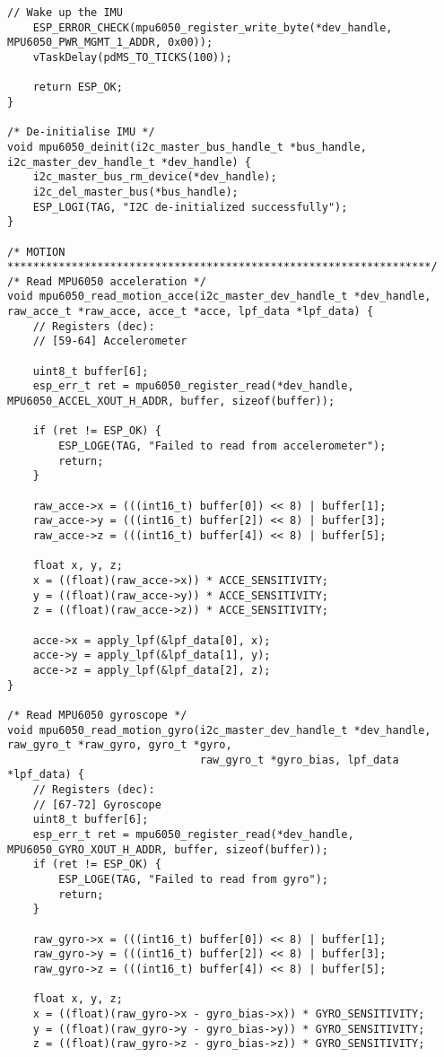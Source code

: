 \begin{lstlisting}[caption={Register Read}]
    // Wake up the IMU
    ESP_ERROR_CHECK(mpu6050_register_write_byte(*dev_handle, MPU6050_PWR_MGMT_1_ADDR, 0x00));
    vTaskDelay(pdMS_TO_TICKS(100)); 

    return ESP_OK;
}

/* De-initialise IMU */
void mpu6050_deinit(i2c_master_bus_handle_t *bus_handle, i2c_master_dev_handle_t *dev_handle) {
    i2c_master_bus_rm_device(*dev_handle);
    i2c_del_master_bus(*bus_handle);
    ESP_LOGI(TAG, "I2C de-initialized successfully");
}

/* MOTION ******************************************************************/
/* Read MPU6050 acceleration */
void mpu6050_read_motion_acce(i2c_master_dev_handle_t *dev_handle, raw_acce_t *raw_acce, acce_t *acce, lpf_data *lpf_data) {
    // Registers (dec):
    // [59-64] Accelerometer

    uint8_t buffer[6];
    esp_err_t ret = mpu6050_register_read(*dev_handle, MPU6050_ACCEL_XOUT_H_ADDR, buffer, sizeof(buffer));

    if (ret != ESP_OK) {
        ESP_LOGE(TAG, "Failed to read from accelerometer");
        return;
    }
    
    raw_acce->x = (((int16_t) buffer[0]) << 8) | buffer[1];
    raw_acce->y = (((int16_t) buffer[2]) << 8) | buffer[3];
    raw_acce->z = (((int16_t) buffer[4]) << 8) | buffer[5];
    
    float x, y, z; 
    x = ((float)(raw_acce->x)) * ACCE_SENSITIVITY;
    y = ((float)(raw_acce->y)) * ACCE_SENSITIVITY;
    z = ((float)(raw_acce->z)) * ACCE_SENSITIVITY;

    acce->x = apply_lpf(&lpf_data[0], x);
    acce->y = apply_lpf(&lpf_data[1], y);
    acce->z = apply_lpf(&lpf_data[2], z);
}

/* Read MPU6050 gyroscope */
void mpu6050_read_motion_gyro(i2c_master_dev_handle_t *dev_handle, raw_gyro_t *raw_gyro, gyro_t *gyro,
                              raw_gyro_t *gyro_bias, lpf_data *lpf_data) {
    // Registers (dec):
    // [67-72] Gyroscope
    uint8_t buffer[6];
    esp_err_t ret = mpu6050_register_read(*dev_handle, MPU6050_GYRO_XOUT_H_ADDR, buffer, sizeof(buffer));
    if (ret != ESP_OK) {
        ESP_LOGE(TAG, "Failed to read from gyro");
        return;
    }

    raw_gyro->x = (((int16_t) buffer[0]) << 8) | buffer[1];
    raw_gyro->y = (((int16_t) buffer[2]) << 8) | buffer[3];
    raw_gyro->z = (((int16_t) buffer[4]) << 8) | buffer[5];
    
    float x, y, z; 
    x = ((float)(raw_gyro->x - gyro_bias->x)) * GYRO_SENSITIVITY;
    y = ((float)(raw_gyro->y - gyro_bias->y)) * GYRO_SENSITIVITY;
    z = ((float)(raw_gyro->z - gyro_bias->z)) * GYRO_SENSITIVITY;


\end{lstlisting}
